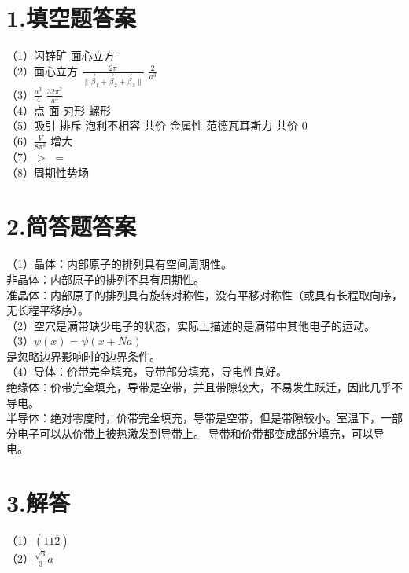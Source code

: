 \documentclass[UTF8]{ctexart}
\begin{document}
\section*{\bfseries 1.填空题答案}
（1）闪锌矿\makebox[2em]{}
面心立方\\
（2）面心立方\makebox[2em]{}
$\frac{2\pi}{\lVert\vec\beta_1+\vec\beta_2+\vec\beta_3\rVert}$\makebox[2em]{}
$\frac{2}{a^3}$\\
（3）$\frac{a^3}{4}$\makebox[2em]{}
$\frac{32\pi^3}{a^3}$\\
（4）点\makebox[2em]{}
面\makebox[2em]{}
刃形\makebox[2em]{}
螺形\\
（5）吸引\makebox[2em]{}
排斥\makebox[2em]{}
泡利不相容\makebox[2em]{}
共价\makebox[2em]{}
金属性\makebox[2em]{}
范德瓦耳斯力\makebox[2em]{}
共价\makebox[2em]{}
0\\
（6）$\frac{V}{8\pi^3}$\makebox[2em]{}
增大\\
（7）$>$\makebox[2em]{}
$=$\\
（8）周期性势场\\
\section*{\bfseries 2.简答题答案}
（1）晶体：内部原子的排列具有空间周期性。\\
非晶体：内部原子的排列不具有周期性。\\
准晶体：内部原子的排列具有旋转对称性，没有平移对称性（或具有长程取向序，无长程平移序）。\\
（2）空穴是满带缺少电子的状态，实际上描述的是满带中其他电子的运动。\\
（3）$\psi(x)=\psi(x+Na)$\\
是忽略边界影响时的边界条件。\\
（4）导体：价带完全填充，导带部分填充，导电性良好。\\
绝缘体：价带完全填充，导带是空带，并且带隙较大，不易发生跃迁，因此几乎不导电。\\
半导体：绝对零度时，价带完全填充，导带是空带，但是带隙较小。室温下，一部分电子可以从价带上被热激发到导带上。
导带和价带都变成部分填充，可以导电。
\section*{\bfseries 3.解答}
（1）$(11\overline{2})$\\
（2）$\frac{\sqrt{6}}{3}a$\\
\end{document}
